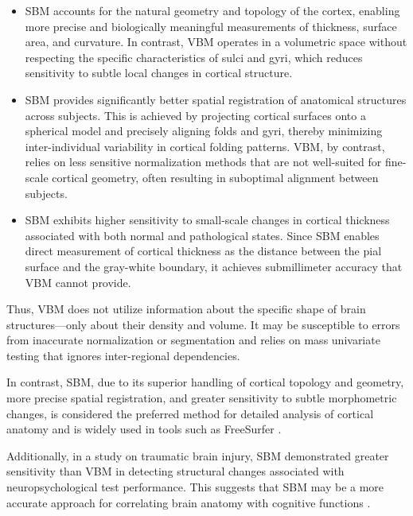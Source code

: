 \documentclass[default]{subfiles}
\begin{document}
\begin{itemize}
    \item SBM accounts for the natural geometry and topology of the cortex, enabling more precise and biologically
    meaningful measurements of thickness, surface area, and curvature. In contrast, VBM operates in a volumetric space
    without respecting the specific characteristics of sulci and gyri, which reduces sensitivity to subtle local
    changes in cortical structure.
    
    \item SBM provides significantly better spatial registration of anatomical structures across subjects. This is
    achieved by projecting cortical surfaces onto a spherical model and precisely aligning folds and gyri, thereby
    minimizing inter-individual variability in cortical folding patterns. VBM, by contrast, relies on less sensitive
    normalization methods that are not well-suited for fine-scale cortical geometry, often resulting in suboptimal
    alignment between subjects.
    
    \item SBM exhibits higher sensitivity to small-scale changes in cortical thickness associated with both normal and
    pathological states. Since SBM enables direct measurement of cortical thickness as the distance between the pial
    surface and the gray-white boundary, it achieves submillimeter accuracy that VBM cannot provide.\newline
\end{itemize}

Thus, VBM does not utilize information about the specific shape of brain structures—only about their density and
volume. It may be susceptible to errors from inaccurate normalization or segmentation and relies on mass univariate
testing that ignores inter-regional dependencies.

In contrast, SBM, due to its superior handling of cortical topology and geometry, more precise spatial registration,
and greater sensitivity to subtle morphometric changes, is considered the preferred method for detailed analysis of
cortical anatomy and is widely used in tools such as FreeSurfer \cite{fischl_2012}.

Additionally, in a study on traumatic brain injury, SBM demonstrated greater sensitivity than VBM in detecting
structural changes associated with neuropsychological test performance. This suggests that SBM may be a more accurate
approach for correlating brain anatomy with cognitive functions \cite{upadhyay_2014}.
\end{document}
